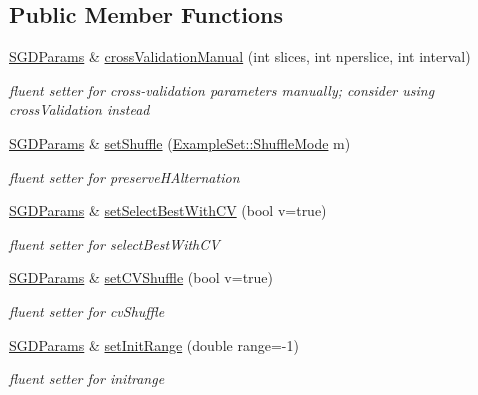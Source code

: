 \subsection*{Public Member Functions}
\begin{DoxyCompactItemize}
\item 
\hyperlink{structNet_1_1SGDParams}{S\+G\+D\+Params} \& \hyperlink{structNet_1_1SGDParams_a12b0553a033fdfcdb966ec47279f98eb}{cross\+Validation\+Manual} (int slices, int nperslice, int interval)
\begin{DoxyCompactList}\small\item\em fluent setter for cross-\/validation parameters manually; consider using cross\+Validation instead \end{DoxyCompactList}\item 
\hyperlink{structNet_1_1SGDParams}{S\+G\+D\+Params} \& \hyperlink{structNet_1_1SGDParams_a2eceadbbd44c7658f953d0ca44a06345}{set\+Shuffle} (\hyperlink{classExampleSet_afcdcdbc9a02c53864997e334d8bae33d}{Example\+Set\+::\+Shuffle\+Mode} m)
\begin{DoxyCompactList}\small\item\em fluent setter for preserve\+H\+Alternation \end{DoxyCompactList}\item 
\hyperlink{structNet_1_1SGDParams}{S\+G\+D\+Params} \& \hyperlink{structNet_1_1SGDParams_ab705e0fa2d8775534c4cdfa89a299fce}{set\+Select\+Best\+With\+CV} (bool v=true)
\begin{DoxyCompactList}\small\item\em fluent setter for select\+Best\+With\+CV \end{DoxyCompactList}\item 
\hyperlink{structNet_1_1SGDParams}{S\+G\+D\+Params} \& \hyperlink{structNet_1_1SGDParams_ae5a768a4f9b457617f181f026cd8769e}{set\+C\+V\+Shuffle} (bool v=true)
\begin{DoxyCompactList}\small\item\em fluent setter for cv\+Shuffle \end{DoxyCompactList}\item 
\hyperlink{structNet_1_1SGDParams}{S\+G\+D\+Params} \& \hyperlink{structNet_1_1SGDParams_a1fc17f8b602dc5364423216f28b2642c}{set\+Init\+Range} (double range=-\/1)
\begin{DoxyCompactList}\small\item\em fluent setter for initrange \end{DoxyCompactList}\item 

\end{DoxyCompactItemize}
